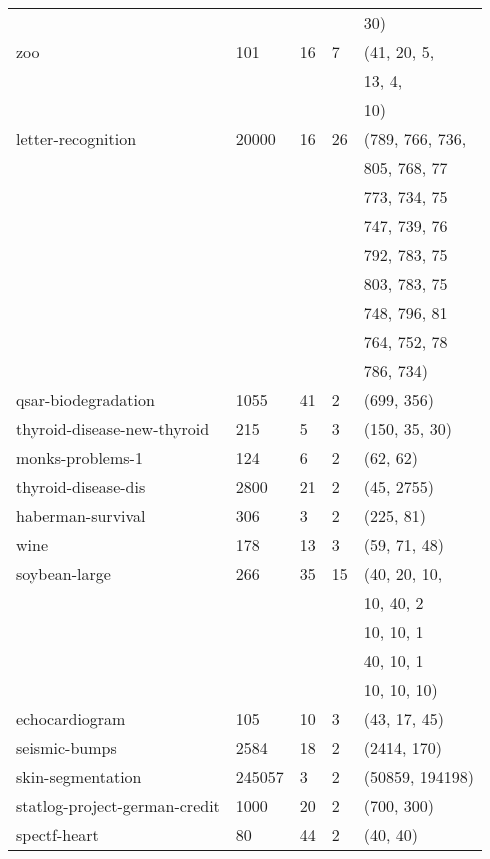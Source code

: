\documentclass{article}%
\begin{document}
\begin{longtable}{l l l l l}
&&&&30)\\%
zoo&101&16&7&(41, 20, 5,\\%
&&&&13, 4, \\%
&&&&10)\\%
letter{-}recognition&20000&16&26&(789, 766, 736,\\%
&&&&805, 768, 77\\%
&&&&773, 734, 75\\%
&&&&747, 739, 76\\%
&&&&792, 783, 75\\%
&&&&803, 783, 75\\%
&&&&748, 796, 81\\%
&&&&764, 752, 78\\%
&&&&786, 734)\\%
qsar{-}biodegradation&1055&41&2&(699, 356)\\%
thyroid{-}disease{-}new{-}thyroid&215&5&3&(150, 35, 30)\\%
monks{-}problems{-}1&124&6&2&(62, 62)\\%
thyroid{-}disease{-}dis&2800&21&2&(45, 2755)\\%
haberman{-}survival&306&3&2&(225, 81)\\%
wine&178&13&3&(59, 71, 48)\\%
soybean{-}large&266&35&15&(40, 20, 10,\\%
&&&&10, 40, 2\\%
&&&&10, 10, 1\\%
&&&&40, 10, 1\\%
&&&&10, 10, 10)\\%
echocardiogram&105&10&3&(43, 17, 45)\\%
seismic{-}bumps&2584&18&2&(2414, 170)\\%
skin{-}segmentation&245057&3&2&(50859, 194198)\\%
statlog{-}project{-}german{-}credit&1000&20&2&(700, 300)\\%
spectf{-}heart&80&44&2&(40, 40)\\%
\end{longtable}%
\end{document}
